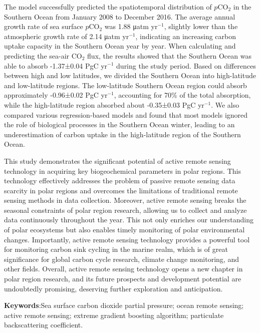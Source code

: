 The model successfully predicted the spatiotemporal distribution of $p\mathrm{CO_2}$ in the Southern Ocean from January 2008 to December 2016. The average annual growth rate of sea surface $p\mathrm{CO_2}$ was 1.88 μatm yr$^{-1}$, slightly lower than the atmospheric growth rate of 2.14 μatm yr$^{-1}$, indicating an increasing carbon uptake capacity in the Southern Ocean year by year. When calculating and predicting the sea-air $\mathrm{CO_2}$ flux, the results showed that the Southern Ocean was able to absorb -1.37±0.04 PgC yr$^{-1}$ during the study period. Based on differences between high and low latitudes, we divided the Southern Ocean into high-latitude and low-latitude regions. The low-latitude Southern Ocean region could absorb approximately -0.96±0.02 PgC yr$^{-1}$, accounting for 70\% of the total absorption, while the high-latitude region absorbed about -0.35±0.03 PgC yr$^{-1}$. We also compared various regression-based models and found that most models ignored the role of biological processes in the Southern Ocean winter, leading to an underestimation of carbon uptake in the high-latitude region of the Southern Ocean.

This study demonstrates the significant potential of active remote sensing technology in acquiring key biogeochemical parameters in polar regions. This technology effectively addresses the problem of passive remote sensing data scarcity in polar regions and overcomes the limitations of traditional remote sensing methods in data collection. Moreover, active remote sensing breaks the seasonal constraints of polar region research, allowing us to collect and analyze data continuously throughout the year. This not only enriches our understanding of polar ecosystems but also enables timely monitoring of polar environmental changes. Importantly, active remote sensing technology provides a powerful tool for monitoring carbon sink cycling in the marine realm, which is of great significance for global carbon cycle research, climate change monitoring, and other fields. Overall, active remote sensing technology opens a new chapter in polar region research, and its future prospects and development potential are undoubtedly promising, deserving further exploration and anticipation.

\textbf{Keywords}:Sea surface carbon dioxide partial pressure; ocean remote sensing; active remote sensing; extreme gradient boosting algorithm; particulate backscattering coefficient.

















